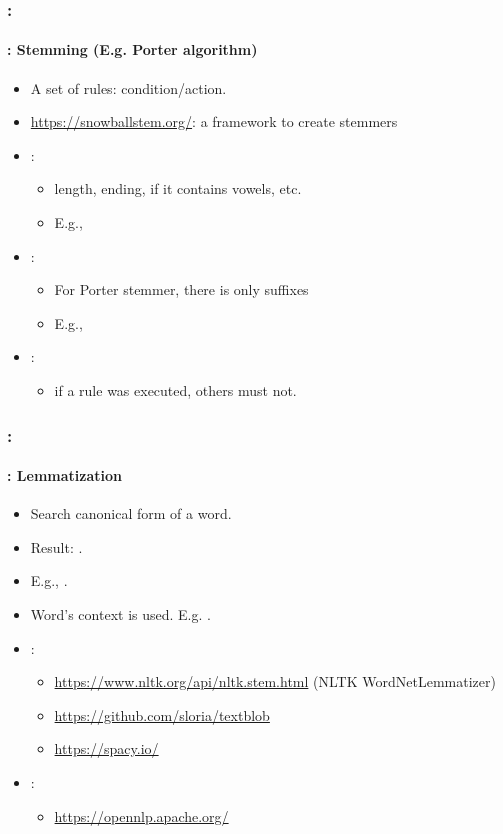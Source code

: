 \documentclass[xcolor=table]{beamer}
\begin{document}
\begin{frame}
	\frametitle{\insertshortsubtitle: \insertsection}
	\framesubtitle{\insertsubsection: Stemming (E.g. Porter algorithm)}

	\begin{itemize}
		\item A set of rules: condition/action.
		\item \url{https://snowballstem.org/}: a framework to create stemmers
		\item {}:
		\begin{itemize}
			\item length, ending, if it contains vowels, etc.
			\item E.g., 
		\end{itemize}
		\item {}:
		\begin{itemize}
			\item For Porter stemmer, there is only suffixes 
			\item E.g., 
		\end{itemize}
		\item {}:
		\begin{itemize}
			\item if a rule was executed, others must not.
		\end{itemize}
	\end{itemize}

\end{frame}

\begin{frame}
	\frametitle{\insertshortsubtitle: \insertsection}
	\framesubtitle{\insertsubsection: Lemmatization}

	\begin{itemize}
		\item Search canonical form of a word.
		\item Result: .
		\item E.g., .
		\item Word's context is used. E.g. .
		\item {}:
		\begin{itemize}
			\item \url{https://www.nltk.org/api/nltk.stem.html} (NLTK WordNetLemmatizer)
			\item \url{https://github.com/sloria/textblob}
			\item \url{https://spacy.io/}
		\end{itemize}
		\item {}:
		\begin{itemize}
			\item \url{https://opennlp.apache.org/}
		\end{itemize}
	\end{itemize}

\end{frame}
\end{document}
